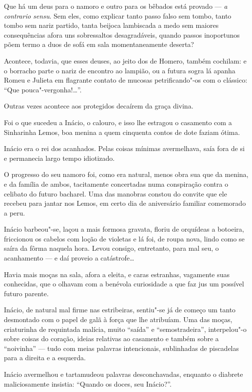Que há um deus para o namoro e outro para os bêbados está provado ---
\emph{a contrario sensu}. Sem eles, como explicar tanto passo falso sem
tombo, tanto tombo sem nariz partido, tanta beijoca lambiscada a medo
sem maiores consequências afora uns sobressaltos desagradáveis, quando
passos inoportunos põem termo a duos de sofá em sala momentaneamente
deserta?

Acontece, todavia, que esses deuses, ao jeito dos de Homero, também
cochilam: e o borracho parte o nariz de encontro ao lampião, ou a futura
sogra lá apanha Romeu e Julieta em flagrante contato de mucosas
petrificando"-os com o clássico: ``Que pouca"-vergonha!\ldots{}''.

Outras vezes acontece aos protegidos decaírem da graça divina.

Foi o que sucedeu a Inácio, o calouro, e isso lhe estragou o casamento
com a Sinharinha Lemos, boa menina a quem cinquenta contos de dote
faziam ótima.

Inácio era o rei dos acanhados. Pelas coisas mínimas avermelhava, saía
fora de si e permanecia largo tempo idiotizado.

O progresso do seu namoro foi, como era natural, menos obra sua que da
menina, e da família de ambos, tacitamente concertadas numa conspiração
contra o celibato do futuro bacharel. Uma das manobras constou do
convite que ele recebeu para jantar nos Lemos, em certo dia de
aniversário familiar comemorado a peru.

Inácio barbeou"-se, laçou a mais formosa gravata, floriu de orquídeas a
botoeira, friccionou os cabelos com loção de violetas e lá foi, de roupa
nova, lindo como se saíra da fôrma naquela hora. Levou consigo,
entretanto, para mal seu, o acanhamento --- e daí proveio a
catástrofe\ldots{}

Havia mais moças na sala, afora a eleita, e caras estranhas, vagamente
suas conhecidas, que o olhavam com a benévola curiosidade a que faz jus
um possível futuro parente.

Inácio, de natural mal firme nas estribeiras, sentiu"-se já de começo um
tanto desmontado com o papel de galã à força que lhe atribuíam. Uma das
moças, criaturinha de requintada malícia, muito ``saída'' e
``semostradeira'', interpelou"-o sobre coisas do coração, ideias
relativas ao casamento e também sobre a ``noivinha'' --- tudo com meias
palavras intencionais, sublinhadas de piscadelas para a direita e a
esquerda.

Inácio avermelhou e tartamudeou palavras desconchavadas, enquanto o
diabrete maliciosamente insistia: ``Quando os doces, seu Inácio?''.

